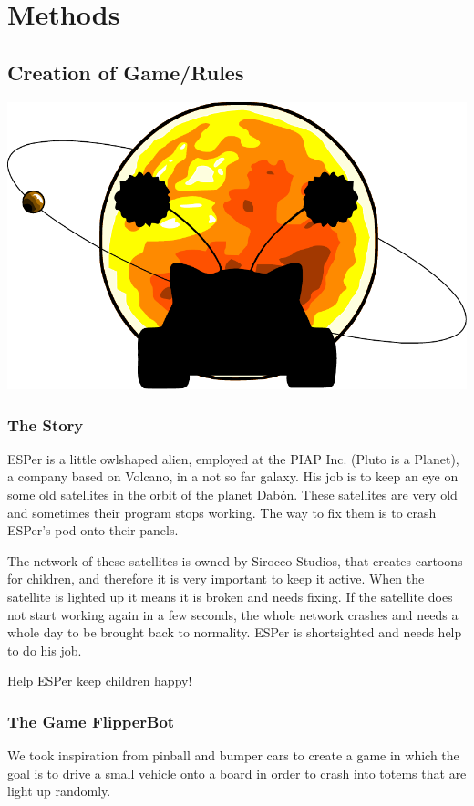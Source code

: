 \documentclass[a4paper,twoside]{book}
\begin{document}
\chapter{Methods}

\section{Creation of Game/Rules}

\includegraphics[width=\textwidth]{img/logo_finito}
\subsection{The Story}

ESPer is a little owl\textendash shaped alien, employed at the PIAP Inc. (Pluto is a Planet), a company based on Volcano, in a not so far galaxy.
His job is to keep an eye on some old satellites in the orbit of the planet Dab\'{o}n.
These satellites are very old and sometimes their program stops working.
The way to fix them is to crash ESPer's pod onto their panels.

The network of these satellites is owned by Sirocco Studios, that creates cartoons for children, and therefore it is very important to keep it active.
When the satellite is lighted up it means it is broken and needs fixing.
If the satellite does not start working again in a few seconds, the whole network crashes and needs a whole day to be brought back to normality.
ESPer is short\textendash sighted and needs help to do his job.

Help ESPer keep children happy!

\subsection{The Game \textendash{} FlipperBot}
We took inspiration from pinball and bumper cars to create a game in which the goal is to drive a small vehicle onto a board in order to crash into totems that are light up randomly.
\end{document}
